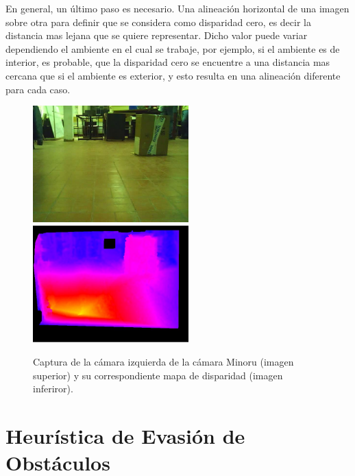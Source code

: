 \documentclass[journal]{IEEEtran}
\begin{document}
En general, un \'ultimo paso es necesario. Una alineaci\'on horizontal de una imagen sobre otra para definir que se considera como disparidad cero, es decir la distancia mas lejana que se quiere representar. Dicho valor puede variar dependiendo el ambiente en el cual se trabaje, por ejemplo, si el ambiente es de interior, es probable, que la disparidad cero se encuentre a una distancia mas cercana que si el ambiente es exterior, y esto resulta en una alineaci\'on diferente para cada caso.


\begin{figure}[ht]
	\begin{center}
		\includegraphics[width=6cm]{./images/original.jpg}
		\includegraphics[width=6cm]{./images/disparidad.jpg}
		\caption{Captura de la c\'amara izquierda de la c\'amara Minoru (imagen superior) y su correspondiente mapa de disparidad (imagen inferiror).}
	\end{center}
\end{figure}

\section{Heur\'istica de Evasi\'on de Obst\'aculos}
\label{sec:heuristica}
\end{document}
